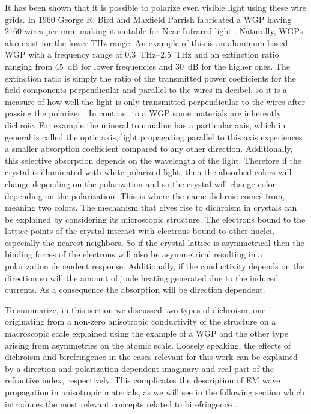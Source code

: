It has been shown that it is possible to polarize even visible light using these wire grids. In 1960 George R. Bird and Maxfield Parrish fabricated a WGP having 2160 wires per mm, making it suitable for Near-Infrared light \cite{Bird1960}. Naturally, WGPs also exist for the lower THz-range. An example of this is an aluminum-based WGP with a frequency range of \SIrange{0.3}{2.5}{\tera \hertz} and an extinction ratio ranging from \SI{45}{\dB} for lower frequencies and \SI{30}{\dB} for the higher ones. The extinction ratio is simply the ratio of the transmitted power coefficients for the field components perpendicular and parallel to the wires in decibel, so it is a measure of how well the light is only transmitted perpendicular to the wires after passing the polarizer \cite{Ferraro2016}. 
In contrast to a WGP some materials are inherently dichroic. For example the mineral tourmaline has a particular axis, which in general is called the optic axis, light propagating parallel to this axis experiences a smaller absorption coefficient compared to any other direction. Additionally, this selective absorption depends on the wavelength of the light. Therefore if the crystal is illuminated with white polarized light, then the absorbed colors will change depending on the polarization and so the crystal will change color depending on the polarization. This is where the name dichroic comes from, meaning two colors. The mechanism that gives rise to dichroism in crystals can be explained by considering its microscopic structure. The electrons bound to the lattice points of the crystal interact with electrons bound to other nuclei, especially the nearest neighbors. So if the crystal lattice is asymmetrical then the binding forces of the electrons will also be asymmetrical resulting in a polarization dependent response. Additionally, if the conductivity depends on the direction so will the amount of joule heating generated due to the induced currents. As a consequence the absorption will be direction dependent. 

To summarize, in this section we discussed two types of dichroism; one originating from a non-zero anisotropic conductivity of the structure on a macroscopic scale explained using the example of a WGP and the other type arising from asymmetries on the atomic scale. Loosely speaking, the effects of dichroism and birefringence in the cases relevant for this work can be explained by a direction and polarization dependent imaginary and real part of the refractive index, respectively. This complicates the description of EM wave propagation in anisotropic materials, as we will see in the following section which introduces the most relevant concepts related to birefringence \cite{Hecht}.

